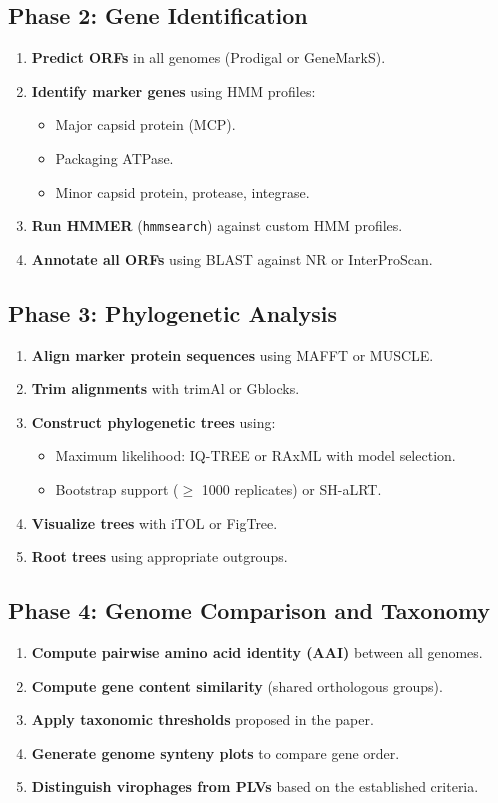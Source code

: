 \documentclass[11pt,a4paper]{article}
\begin{document}
\subsection{Phase 2: Gene Identification}
\begin{enumerate}[label=\textbf{2.\arabic*}]
  \item \textbf{Predict ORFs} in all genomes (Prodigal or GeneMarkS).
  \item \textbf{Identify marker genes} using HMM profiles:
    \begin{itemize}
      \item Major capsid protein (MCP).
      \item Packaging ATPase.
      \item Minor capsid protein, protease, integrase.
    \end{itemize}
  \item \textbf{Run HMMER} (\texttt{hmmsearch}) against custom HMM profiles.
  \item \textbf{Annotate all ORFs} using BLAST against NR or InterProScan.
\end{enumerate}

\subsection{Phase 3: Phylogenetic Analysis}
\begin{enumerate}[label=\textbf{3.\arabic*}]
  \item \textbf{Align marker protein sequences} using MAFFT or MUSCLE.
  \item \textbf{Trim alignments} with trimAl or Gblocks.
  \item \textbf{Construct phylogenetic trees} using:
    \begin{itemize}
      \item Maximum likelihood: IQ-TREE or RAxML with model selection.
      \item Bootstrap support ($\geq$ 1000 replicates) or SH-aLRT.
    \end{itemize}
  \item \textbf{Visualize trees} with iTOL or FigTree.
  \item \textbf{Root trees} using appropriate outgroups.
\end{enumerate}

\subsection{Phase 4: Genome Comparison and Taxonomy}
\begin{enumerate}[label=\textbf{4.\arabic*}]
  \item \textbf{Compute pairwise amino acid identity (AAI)} between all genomes.
  \item \textbf{Compute gene content similarity} (shared orthologous groups).
  \item \textbf{Apply taxonomic thresholds} proposed in the paper.
  \item \textbf{Generate genome synteny plots} to compare gene order.
  \item \textbf{Distinguish virophages from PLVs} based on the established criteria.
\end{enumerate}
\end{document}
